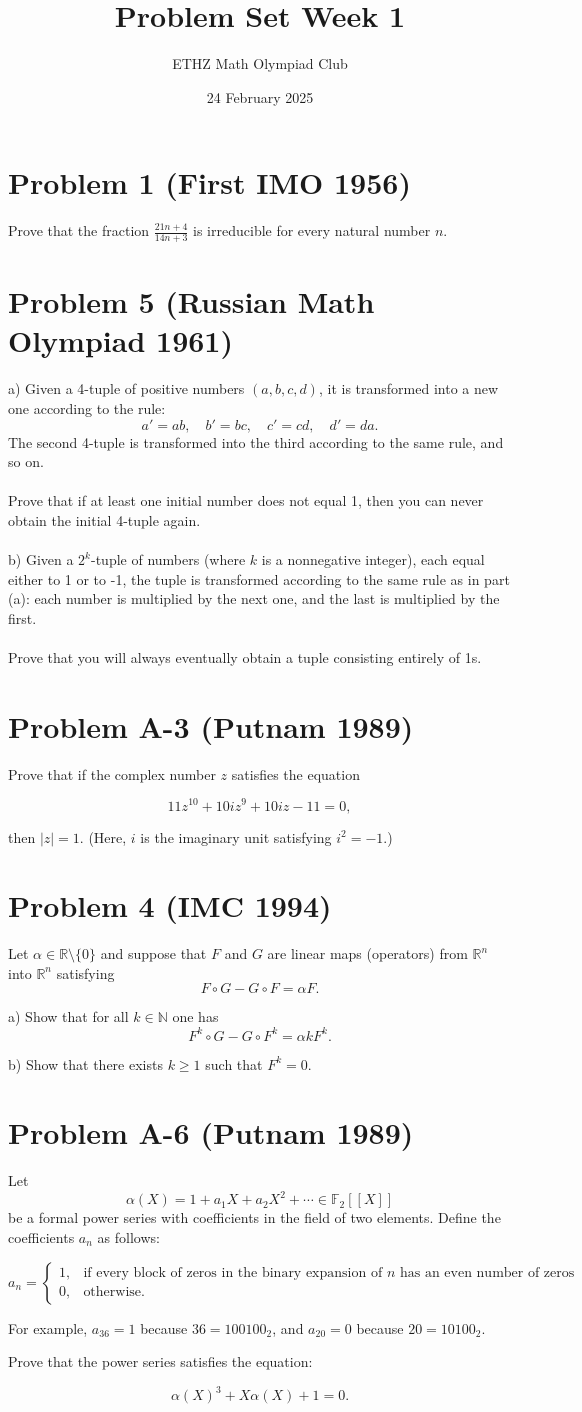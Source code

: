 \documentclass[11pt, a4paper, oneside]{article}
\title{Problem Set Week 1}
\author{ETHZ Math Olympiad Club}
\date{24 February 2025}
\newcommand{\problem}[1][]{\section{#1} \hfill \par}
\theoremstyle{remark}
\begin{document}
\maketitle

\problem[Problem 1 (First IMO 1956)]
Prove that the fraction \(\frac{21n+4}{14n+3}\) is irreducible for every natural number \(n\).

\problem[Problem 5 (Russian Math Olympiad 1961)]
a) Given a 4-tuple of positive numbers \((a,b,c,d)\), it is transformed into a new one according to the rule:
    \[
    a' = ab, \quad b' = bc, \quad c' = cd, \quad d' = da.
    \]
The second 4-tuple is transformed into the third according to the same rule, and so on.
\\\\
Prove that if at least one initial number does not equal 1, then you can never obtain the initial 4-tuple again.
\\\\
b) Given a \(2^k\)-tuple of numbers (where \(k\) is a nonnegative integer), each equal either to 1 or to -1, the tuple is transformed according to the same rule as in part (a): each number is multiplied by the next one, and the last is multiplied by the first.
\\\\
Prove that you will always eventually obtain a tuple consisting entirely of 1s.
    
\problem[Problem A-3 (Putnam 1989)]
Prove that if the complex number \( z \) satisfies the equation

\[
11z^{10} + 10i z^9 + 10i z -11 = 0,
\]

then \( |z| = 1 \). (Here, \( i \) is the imaginary unit satisfying \( i^2 = -1 \).)

\problem[Problem 4 (IMC 1994)]
Let \( \alpha \in \mathbb{R} \setminus \{0\} \) and suppose that \( F \) and \( G \) are linear maps (operators) from \( \mathbb{R}^n \) into \( \mathbb{R}^n \) satisfying 
\[
F \circ G - G \circ F = \alpha F.
\]

a) Show that for all \( k \in \mathbb{N} \) one has 
\[
F^k \circ G - G \circ F^k = \alpha k F^k.
\]

b) Show that there exists \( k \geq 1 \) such that \( F^k = 0 \).


\problem[Problem A-6 (Putnam 1989)]

Let 
\[
\alpha(X) = 1 + a_1 X + a_2 X^2 + \cdots \in \mathbb{F}_2[[X]]
\]
be a formal power series with coefficients in the field of two elements. Define the coefficients \( a_n \) as follows:

\[
a_n =
\begin{cases} 
1, & \text{if every block of zeros in the binary expansion of } n \text{ has an even number of zeros} \\
0, & \text{otherwise}.
\end{cases}
\]

For example, \( a_{36} = 1 \) because \( 36 = 100100_2 \), and \( a_{20} = 0 \) because \( 20 = 10100_2 \). 

Prove that the power series satisfies the equation:

\[
\alpha(X)^3 + X \alpha(X) + 1 = 0.
\]
\end{document}
